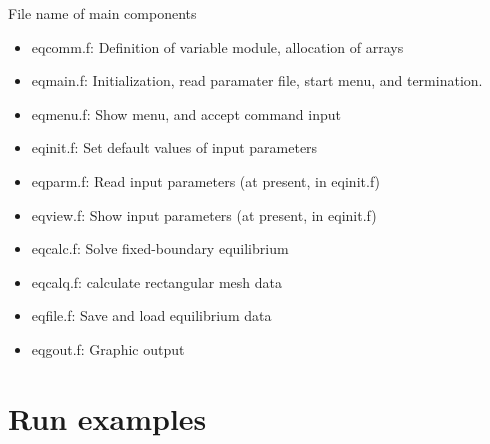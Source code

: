 \documentclass[11pt]{article}
\begin{document}
File name of main components

\begin{itemize}
\item[] eqcomm.f: Definition of variable module, allocation of arrays
\item[] eqmain.f: Initialization, read paramater file, start menu,
 and termination.
\item[] eqmenu.f: Show menu, and accept command input
\item[] eqinit.f: Set default values of input parameters
\item[] eqparm.f: Read input parameters (at present, in eqinit.f)
\item[] eqview.f: Show input parameters (at present, in eqinit.f)
\item[] eqcalc.f: Solve fixed-boundary equilibrium
\item[] eqcalq.f: calculate rectangular mesh data
\item[] eqfile.f: Save and load equilibrium data
\item[] eqgout.f: Graphic output
\end{itemize}

\section{Run examples}
\end{document}
